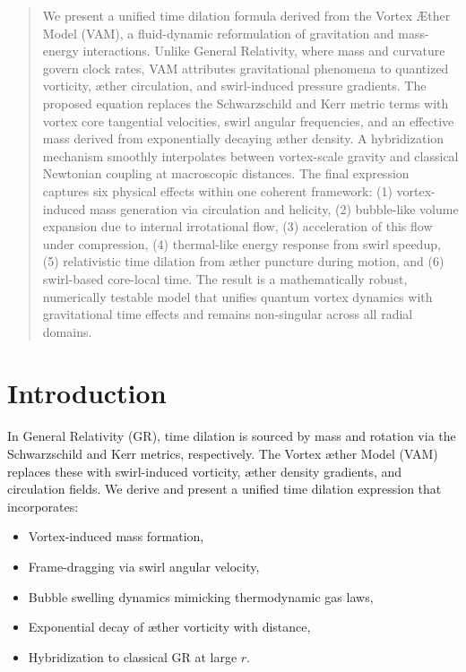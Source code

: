 \documentclass[12pt]{article}
\begin{document}
  \titlepageOpen

\begin{abstract}
We present a unified time dilation formula derived from the Vortex \AE{}ther Model (VAM), a fluid-dynamic reformulation of gravitation and mass-energy interactions. Unlike General Relativity, where mass and curvature govern clock rates, VAM attributes gravitational phenomena to quantized vorticity, æther circulation, and swirl-induced pressure gradients. The proposed equation replaces the Schwarzschild and Kerr metric terms with vortex core tangential velocities, swirl angular frequencies, and an effective mass derived from exponentially decaying æther density. A hybridization mechanism smoothly interpolates between vortex-scale gravity and classical Newtonian coupling at macroscopic distances. The final expression captures six physical effects within one coherent framework: (1) vortex-induced mass generation via circulation and helicity, (2) bubble-like volume expansion due to internal irrotational flow, (3) acceleration of this flow under compression, (4) thermal-like energy response from swirl speedup, (5) relativistic time dilation from æther puncture during motion, and (6) swirl-based core-local time. The result is a mathematically robust, numerically testable model that unifies quantum vortex dynamics with gravitational time effects and remains non-singular across all radial domains.
\end{abstract}

  \titlepageClose
\fi

\section{\appendixtitle}


\section*{Introduction}
In General Relativity (GR), time dilation is sourced by mass and rotation via the Schwarzschild and Kerr metrics, respectively. The Vortex \ae{}ther Model (VAM) replaces these with swirl-induced vorticity, æther density gradients, and circulation fields. We derive and present a unified time dilation expression that incorporates:

\begin{itemize}
    \item Vortex-induced mass formation,
    \item Frame-dragging via swirl angular velocity,
    \item Bubble swelling dynamics mimicking thermodynamic gas laws,
    \item Exponential decay of æther vorticity with distance,
    \item Hybridization to classical GR at large $r$.
\end{itemize}
\end{document}
